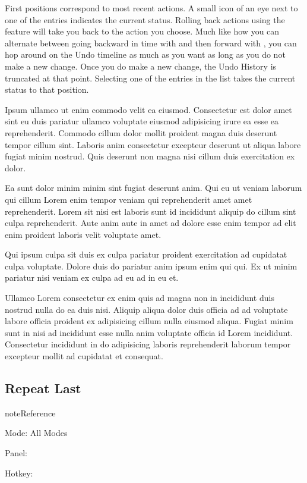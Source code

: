 \documentclass[a4paper,10pt,french]{sphinxmanual}
\begin{document}
First positions correspond to most recent actions.
A small icon of an eye next to one of the entries indicates the current status.
Rolling back actions using the  feature will take you back to the
action you choose. Much like how you can alternate between going backward in
time with  and then forward with ,
you can hop around on the Undo timeline as much as you want as long as you do not make a new change.
Once you do make a new change, the Undo History is truncated at that point.
Selecting one of the entries in the list takes the current status to that position.

Ipsum ullamco ut enim commodo velit ea eiusmod. Consectetur est dolor amet sint eu duis pariatur ullamco voluptate eiusmod adipisicing irure ea esse ea reprehenderit. Commodo cillum dolor mollit proident magna duis deserunt tempor cillum sint. Laboris anim consectetur excepteur deserunt ut aliqua labore fugiat minim nostrud. Quis deserunt non magna nisi cillum duis exercitation ex dolor.

Ea sunt dolor minim minim sint fugiat deserunt anim. Qui eu ut veniam laborum qui cillum Lorem enim tempor veniam qui reprehenderit amet amet reprehenderit. Lorem sit nisi est laboris sunt id incididunt aliquip do cillum sint culpa reprehenderit. Aute anim aute in amet ad dolore esse enim tempor ad elit enim proident laboris velit voluptate amet.

Qui ipsum culpa sit duis ex culpa pariatur proident exercitation ad cupidatat culpa voluptate. Dolore duis do pariatur anim ipsum enim qui qui. Ex ut minim pariatur nisi veniam ex culpa ad eu ad in eu et.

Ullamco Lorem consectetur ex enim quis ad magna non in incididunt duis nostrud nulla do ea duis nisi. Aliquip aliqua dolor duis officia ad ad voluptate labore officia proident ex adipisicing cillum nulla eiusmod aliqua. Fugiat minim sunt in nisi ad incididunt esse nulla anim voluptate officia id Lorem incididunt. Consectetur incididunt in do adipisicing laboris reprehenderit laborum tempor excepteur mollit ad cupidatat et consequat.


\subsection{Repeat Last}
\label{\detokenize{docs/tuts/autocad-tut01:repeat-last}}
\begin{sphinxadmonition}{note}{Reference}

\begin{DUlineblock}{0em}
\item[] Mode:     All Modes
\item[] Panel:    
\item[] Hotkey:   
\end{DUlineblock}
\end{sphinxadmonition}
\end{document}
